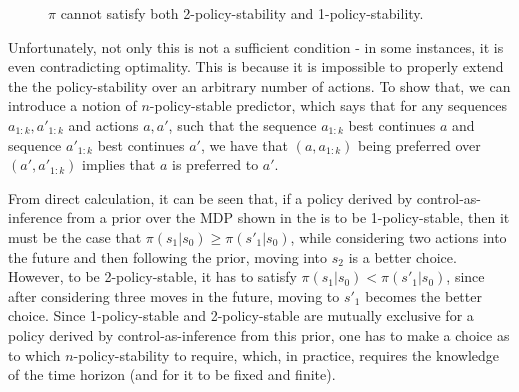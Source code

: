 \begin{figure}
\centering
    \caption{$\pi$ cannot satisfy both 2-policy-stability and 1-policy-stability.}
    \label{fig:not-policy-stable}
\end{figure}

Unfortunately, not only this is not a sufficient condition - in some instances, it is even contradicting optimality. This is because it is impossible to properly extend the the policy-stability over an arbitrary number of actions. To show that, we can introduce a notion of $n$-policy-stable predictor, which says that for any sequences $a_{1:k}, a'_{1:k}$ and actions $a, a'$, such that the sequence $a_{1:k}$ best continues $a$ and sequence $a'_{1:k}$ best continues $a'$, we have that $(a, a_{1:k})$ being preferred over $(a', a'_{1:k})$ implies that $a$ is preferred to $a'$. 

From direct calculation, it can be seen that, if a policy derived by control-as-inference from a prior over the MDP shown in the  is to be 1-policy-stable, then it must be the case that $\pi(s_1|s_0) \geq \pi(s'_1|s_0)$, while considering two actions into the future and then following the prior, moving into $s_2$ is a better choice. However, to be 2-policy-stable, it has to satisfy $\pi(s_1|s_0) < \pi(s'_1|s_0)$, since after considering three moves in the future, moving to $s'_1$ becomes the better choice. Since 1-policy-stable and 2-policy-stable are mutually exclusive for a policy derived by control-as-inference from this prior, one has to make a choice as to which $n$-policy-stability to require, which, in practice, requires the knowledge of the time horizon (and for it to be fixed and finite).

